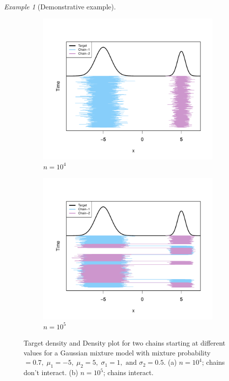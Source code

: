 \documentclass[11pt]{article}
\theoremstyle{remark}
\newtheorem{example}{Example}
\begin{document}
\begin{example}[Demonstrative example]
\begin{figure}[htbp]
    \begin{subfigure}{.5\textwidth}
   \centering
   \includegraphics[width=\linewidth]{plots/gaussian-Targettrace_n1e4.pdf}
   \caption{$n = 10^4$}
   \label{subfig:gauss-trace_1e4}
 \end{subfigure}
 \begin{subfigure}{0.5\textwidth}
   \centering
   \includegraphics[width=\linewidth]{plots/gaussian-Targettrace_n1e5.pdf} 
   \caption{$n = 10^5$}
   \label{subfig:gauss-trace_1e5}
 \end{subfigure}
    \caption{Target density and Density plot for two chains starting at different values for a Gaussian mixture model with mixture probability $= 0.7, \; \mu_1 = -5, \; \mu_2 = 5, \; \sigma_1 = 1, \textrm{ and } \sigma_2 = 0.5$. (a) $n = 10^4$; chains don't interact. (b) $n = 10^5$; chains interact.}
    \label{fig:gaussian-trace}
\end{figure}


\end{example}
\end{document}
